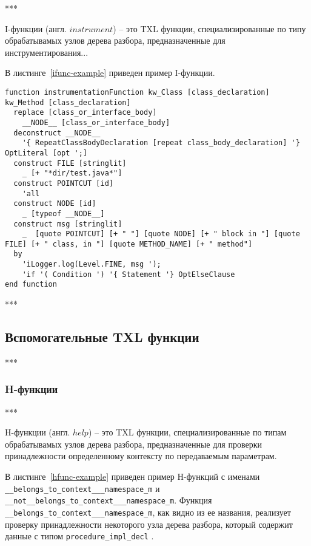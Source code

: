 ***

I-функции (англ. $instrument$) -- это TXL функции, специализированные по типу обрабатывамых узлов дерева разбора, предназначенные для инструментирования...

В листинге~\ref{ifunc-example} приведен пример I-функции.

\begin{lstlisting}[frame=single, language=TXL, label={ifunc-example}, caption={Пример I-функции}]
function instrumentationFunction kw_Class [class_declaration] kw_Method [class_declaration]
  replace [class_or_interface_body]
    __NODE__ [class_or_interface_body]
  deconstruct __NODE__
    '{ RepeatClassBodyDeclaration [repeat class_body_declaration] '} OptLiteral [opt ';]
  construct FILE [stringlit]
    _ [+ "*dir/test.java*"]
  construct POINTCUT [id]
    'all
  construct NODE [id]
    _ [typeof __NODE__]
  construct msg [stringlit]
    _  [quote POINTCUT] [+ " "] [quote NODE] [+ " block in "] [quote FILE] [+ " class, in "] [quote METHOD_NAME] [+ " method"]
  by
    'iLogger.log(Level.FINE, msg ');
    'if '( Condition ') '{ Statement '} OptElseClause
end function
\end{lstlisting}

***

\subsection{Вспомогательные TXL функции}

***

\subsubsection{H-функции}

***

H-функции (англ. $help$) -- это TXL функции, специализированные по типам обрабатывамых узлов дерева разбора, предназначенные для проверки принадлежности определенному контексту по передаваемым параметрам.

В листинге~\ref{hfunc-example} приведен пример H-функций с именами \lstinline{__belongs_to_context___namespace_m} и \lstinline{__not__belongs_to_context___namespace_m}.
Функция \lstinline{__belongs_to_context___namespace_m}, как видно из ее названия, реализует проверку принадлежности некоторого узла дерева разбора, который содержит данные с типом \lstinline{procedure_impl_decl} .

